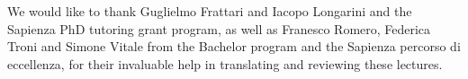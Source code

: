 %
%


We would like to thank Guglielmo Frattari and Iacopo Longarini and the Sapienza PhD tutoring grant program, as well as Franesco Romero, Federica Troni and Simone Vitale from the Bachelor program and the Sapienza percorso di eccellenza, for their invaluable help in translating and reviewing these lectures. 
